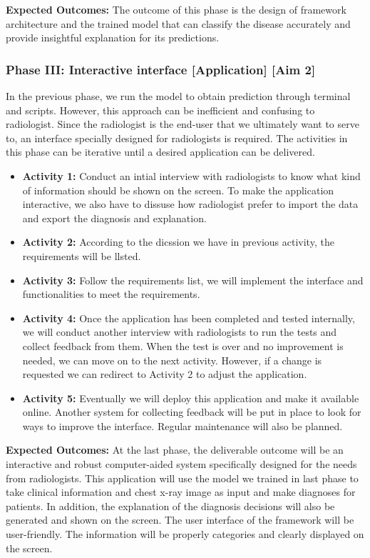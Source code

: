 \textbf{Expected Outcomes:}
The outcome of this phase is the design of framework architecture and the trained model that can classify the disease accurately and provide insightful explanation for its predictions.

\subsubsection*{Phase III: Interactive interface [Application] [Aim 2]}
In the previous phase, we run the model to obtain prediction through terminal and scripts. However, this approach can be inefficient and confusing to radiologist. Since the radiologist is the end-user that we ultimately want to serve to, an interface specially designed for radiologists is required. The activities in this phase can be iterative until a desired application can be delivered.

\begin{itemize}
    \item \textbf{Activity 1:} Conduct an intial interview with radiologists to know what kind of information should be shown on the screen. To make the application interactive, we also have to dissuse how radiologist prefer to import the data and export the diagnosis and explanation. 
    \item \textbf{Activity 2:} According to the dicssion we have in previous activity, the requirements will be llsted.
    \item \textbf{Activity 3:} Follow the requirements list, we will implement the interface and functionalities to meet the requirements.
    \item \textbf{Activity 4:} Once the application has been completed and tested internally, we will conduct another interview with radiologists to run the tests and collect feedback from them. When the test is over and no improvement is needed, we can move on to the next activity. However, if a change is requested we can redirect to Activity 2 to adjust the application.    
    \item \textbf{Activity 5:} Eventually we will deploy this application and make it available online. Another system for collecting feedback will be put in place to look for ways to improve the interface. Regular maintenance will also be planned.
\end{itemize}


\textbf{Expected Outcomes:}
At the last phase, the deliverable outcome will be an interactive and robust computer-aided system specifically designed for the needs from radiologists. This application will use the model we trained in last phase to take clinical information and chest x-ray image as input and make diagnoses for patients. In addition, the explanation of the diagnosis decisions will also be generated and shown on the screen. The user interface of the framework will be user-friendly. The information will be properly categories and clearly displayed on the screen.


